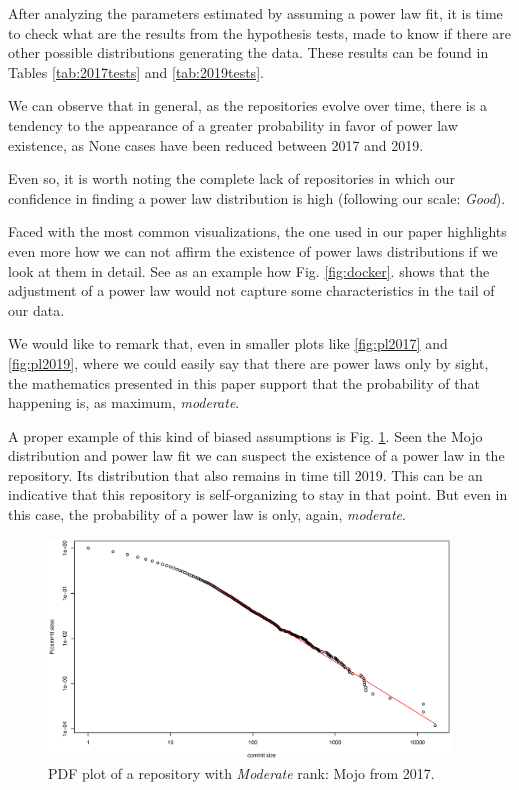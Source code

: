 \documentclass{article}
\begin{document}
After analyzing the parameters estimated by assuming a power law fit,
it is time to check what are 
the results from the hypothesis tests, made to know if there are other
possible distributions generating the data. These results can be found
in Tables \ref{tab:2017tests} and \ref{tab:2019tests}.

We can observe that in general, as the repositories evolve over time,
there is a tendency to the appearance of a greater probability in
favor of power law existence, as None cases have been reduced between
2017 and 2019.

Even so, it is worth noting the complete lack of repositories in which
our confidence in finding a power law distribution is high (following
our scale: \textit{Good}).

Faced with the most common visualizations, the one used in our paper
highlights even more how we can not affirm the existence of power laws
distributions if we look at them in detail. See as an example how
Fig. \ref{fig:docker}. shows that the adjustment of a power law would
not capture some characteristics in the tail of our data.

We would like to remark that, even in smaller plots like
\ref{fig:pl2017} and \ref{fig:pl2019}, where we could easily say that
there are power laws only by sight, the mathematics presented in this
paper support that the probability of that happening is, as maximum,
\textit{ moderate}.

A proper example of this kind of biased assumptions is
Fig. \ref{fig:mojo}. Seen the Mojo distribution and power law fit we
can suspect the existence of a power law in the repository. Its
distribution that also remains in time till 2019. This can be an
indicative that this repository is self-organizing to stay in that
point. But even in this case, the probability of a power law is only,
again, \textit{moderate}.

\begin{figure}[htbp]
  \centerline{\includegraphics[width=0.95\textwidth]{plots/mojo-2017.eps}}
  \caption{PDF plot of a repository with \textit{Moderate} rank: Mojo
    from 2017.}
  \label{fig:mojo}
\end{figure}
\end{document}
